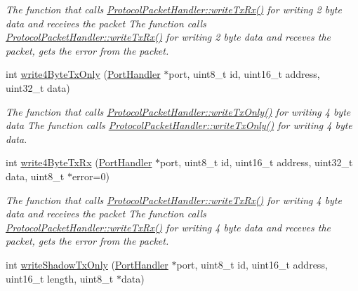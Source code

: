 \begin{DoxyCompactItemize}
\begin{DoxyCompactList}\small\item\em The function that calls \hyperlink{classmercury_1_1_protocol_packet_handler_a13921f2ddae0c1f1f7ac3669d1a15470}{Protocol\+Packet\+Handler\+::write\+Tx\+Rx()} for writing 2 byte data and receives the packet  The function calls \hyperlink{classmercury_1_1_protocol_packet_handler_a13921f2ddae0c1f1f7ac3669d1a15470}{Protocol\+Packet\+Handler\+::write\+Tx\+Rx()} for writing 2 byte data and receves the packet,  gets the error from the packet. \end{DoxyCompactList}\item 
int \hyperlink{classmercury_1_1_protocol_packet_handler_a88c64703e5947188e7c83d57dd2a8ffc}{write4\+Byte\+Tx\+Only} (\hyperlink{classmercury_1_1_port_handler}{Port\+Handler} $\ast$port, uint8\+\_\+t id, uint16\+\_\+t address, uint32\+\_\+t data)
\begin{DoxyCompactList}\small\item\em The function that calls \hyperlink{classmercury_1_1_protocol_packet_handler_adf6e96b412135484dac0ff7ff9c2bf36}{Protocol\+Packet\+Handler\+::write\+Tx\+Only()} for writing 4 byte data  The function calls \hyperlink{classmercury_1_1_protocol_packet_handler_adf6e96b412135484dac0ff7ff9c2bf36}{Protocol\+Packet\+Handler\+::write\+Tx\+Only()} for writing 4 byte data. \end{DoxyCompactList}\item 
int \hyperlink{classmercury_1_1_protocol_packet_handler_abdcdc58ceead4033768386c5de3eb066}{write4\+Byte\+Tx\+Rx} (\hyperlink{classmercury_1_1_port_handler}{Port\+Handler} $\ast$port, uint8\+\_\+t id, uint16\+\_\+t address, uint32\+\_\+t data, uint8\+\_\+t $\ast$error=0)
\begin{DoxyCompactList}\small\item\em The function that calls \hyperlink{classmercury_1_1_protocol_packet_handler_a13921f2ddae0c1f1f7ac3669d1a15470}{Protocol\+Packet\+Handler\+::write\+Tx\+Rx()} for writing 4 byte data and receives the packet  The function calls \hyperlink{classmercury_1_1_protocol_packet_handler_a13921f2ddae0c1f1f7ac3669d1a15470}{Protocol\+Packet\+Handler\+::write\+Tx\+Rx()} for writing 4 byte data and receves the packet,  gets the error from the packet. \end{DoxyCompactList}\item 
int \hyperlink{classmercury_1_1_protocol_packet_handler_a38b187dbb26583cb57fb7592e4be8136}{write\+Shadow\+Tx\+Only} (\hyperlink{classmercury_1_1_port_handler}{Port\+Handler} $\ast$port, uint8\+\_\+t id, uint16\+\_\+t address, uint16\+\_\+t length, uint8\+\_\+t $\ast$data)

\end{DoxyCompactItemize}
